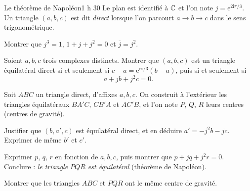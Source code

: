 

\begin{defi}{Le théorème de Napoléon}{1 h 30}
Le plan est identifié à $\mathbb{C}$ et l'on note $j=\mathrm{e}^{2\mathrm{i}\pi/3}$.
Un triangle $(a,b,c)$ est dit \emph{direct} lorsque l'on parcourt
$a\to b\to c$ dans le sens trigonométrique.

\begin{questions}
  \item Montrer que $j^{3}=1$, $1+j+j^{2}=0$ et $\overline{j}=j^{2}$.
  \item Soient $a,b,c$ trois complexes distincts. Montrer que $(a,b,c)$
    est un triangle équilatéral direct si et seulement si
    $c-a=\mathrm{e}^{\mathrm{i}\pi/3}(b-a)$, puis si et seulement si
    \[
    a+jb+j^{2}c=0 .
    \]
\end{questions}

Soit $ABC$ un triangle direct, d'affixes $a,b,c$. On construit à
l'extérieur les triangles équilatéraux $BA'C$, $CB'A$ et $AC'B$, et l'on
note $P$, $Q$, $R$ leurs centres (centres de gravité).
\begin{questions}[resume]
  \item Justifier que $(b,a',c)$ est équilatéral direct, et en déduire
    $a'=-j^{2}b-jc$. Exprimer de même $b'$ et $c'$.
  \item Exprimer $p$, $q$, $r$ en fonction de $a,b,c$, puis montrer que
    $p+jq+j^{2}r=0$. Conclure : \emph{le triangle $PQR$ est
    équilatéral} (théorème de Napoléon).
  \item Montrer que les triangles $ABC$ et $PQR$ ont le même centre de
    gravité.
\end{questions}


\end{defi}

